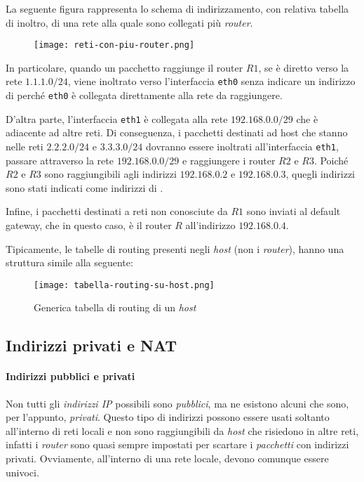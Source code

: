 \begin{eg}
    La seguente figura rappresenta lo schema di indirizzamento, con relativa
    tabella di inoltro, di una rete alla quale sono collegati più \emph{router}.
    \begin{figure}[ht]
        \centering
        \texttt{[image: reti-con-piu-router.png]}
    \end{figure}
    \newpage
    \noindent In particolare, quando un pacchetto raggiunge il router
    $R1$, se è diretto verso la rete $1.1.1.0/24$, viene inoltrato verso
    l'interfaccia \texttt{eth0} senza indicare un indirizzo di 
    perché \texttt{eth0} è collegata direttamente alla rete da raggiungere.

    D'altra parte, l'interfaccia \texttt{eth1} è collegata alla rete $192.168.0.0/29$
    che è adiacente ad altre reti. Di conseguenza, i pacchetti destinati
    ad host che stanno nelle reti $2.2.2.0/24$ e $3.3.3.0/24$ dovranno
    essere inoltrati all'interfaccia \texttt{eth1}, passare attraverso la rete
    $192.168.0.0/29$ e raggiungere i router $R2$ e $R3$. Poiché $R2$ e $R3$
    sono raggiungibili agli indirizzi $192.168.0.2$ e $192.168.0.3$, quegli
    indirizzi sono stati indicati come indirizzi di .

    Infine, i pacchetti destinati a reti non conosciute da $R1$ sono inviati al
    default gateway, che in questo caso, è il router $R$ all'indirizzo $192.168.0.4$.
\end{eg}

\begin{note}
    Tipicamente, le tabelle di routing presenti negli \emph{host} (non i
    \emph{router}), hanno una struttura simile alla seguente:
    \begin{figure}[h]
        \centering
        \texttt{[image: tabella-routing-su-host.png]}
        \caption{Generica tabella di routing di un \emph{host}}
    \end{figure}
\end{note}

\subsection{Indirizzi privati e NAT}
\paragraph{Indirizzi pubblici e privati}
Non tutti gli \emph{indirizzi IP} possibili sono \emph{pubblici}, ma ne esistono
alcuni che sono, per l'appunto, \emph{privati}. Questo tipo di indirizzi possono
essere usati soltanto all'interno di reti locali e non sono raggiungibili da
\emph{host} che risiedono in altre reti, infatti i \emph{router} sono quasi
sempre impostati per scartare i \emph{pacchetti} con indirizzi privati.
Ovviamente, all'interno di una rete locale, devono comunque essere univoci.

